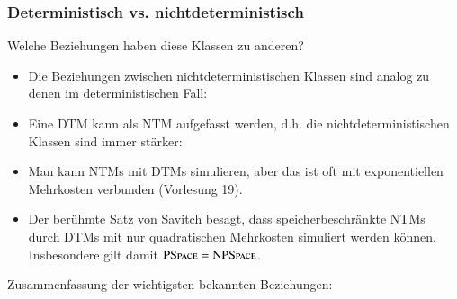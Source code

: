 \documentclass[onlymath]{beamer}
\begin{document}
\begin{frame}\frametitle{Deterministisch vs. nichtdeterministisch}

%
Welche Beziehungen haben diese Klassen zu anderen?\pause
{\footnotesize
\begin{itemize}
\item Die Beziehungen zwischen nichtdeterministischen Klassen sind analog zu denen im deterministischen Fall:\\[1ex]
\pause
\item Eine DTM kann als NTM aufgefasst werden, d.h. die nichtdeterministischen Klassen sind immer stärker:\\[1ex]
\pause
\item Man kann NTMs mit DTMs simulieren, aber das ist oft mit exponentiellen Mehrkosten verbunden (Vorlesung 19).
\pause
\item Der berühmte \alert{Satz von Savitch} besagt, dass speicherbeschränkte NTMs durch DTMs mit nur quadratischen Mehrkosten simuliert werden können. Insbesondere gilt damit ${\textsc{PSpace}}= {\textsc{NPSpace}}$.
\end{itemize}}
Zusammenfassung der wichtigsten bekannten Beziehungen:
\theobox{
\[\Scomplclass{L}\subseteq\Scomplclass{NL}\subseteq \Scomplclass{P}\subseteq\Scomplclass{NP}\subseteq\Scomplclass{PSpace}= \Scomplclass{NPSpace}\subseteq \Scomplclass{Exp}\subseteq \Scomplclass{NExp}\]
\vspace{-2.5ex}
}

\end{frame}
\end{document}

